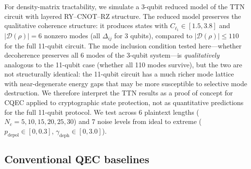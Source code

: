 \documentclass[prx,twocolumn,superscriptaddress,longbibliography,floatfix]{revtex4-2}
\begin{document}
For density-matrix tractability, we simulate a 3-qubit reduced model of the TTN circuit with layered RY--CNOT--RZ structure.
The reduced model preserves the qualitative coherence structure: it produces states with $C_{\ell_1} \in [1.5, 3.8]$ and $|\mathcal{D}(\rho)| = 6$ nonzero modes (all $\Delta_{ij}$ for 3 qubits), compared to $|\mathcal{D}(\rho)| \leq 110$ for the full 11-qubit circuit.
The mode inclusion condition tested here---whether decoherence preserves all 6 modes of the 3-qubit system---is \emph{qualitatively} analogous to the 11-qubit case (whether all 110 modes survive), but the two are not structurally identical: the 11-qubit circuit has a much richer mode lattice with near-degenerate energy gaps that may be more susceptible to selective mode destruction.
We therefore interpret the TTN results as a proof of concept for CQEC applied to cryptographic state protection, not as quantitative predictions for the full 11-qubit protocol.
We test across 6 plaintext lengths ($N_c = 5, 10, 15, 20, 25, 30$) and 7 noise levels from ideal to extreme ($p_\mathrm{depol} \in [0, 0.3]$, $\gamma_\mathrm{deph} \in [0, 3.0]$).


\subsection{Conventional QEC baselines}
\label{sec:qec_baselines}
\end{document}

